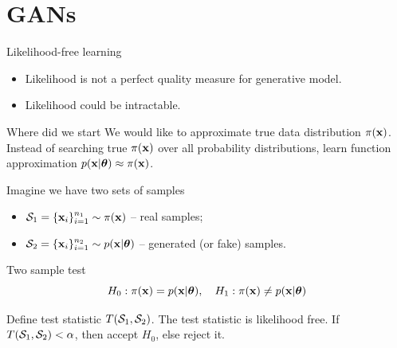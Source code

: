 \documentclass{beamer}
\begin{document}
\section{GANs}
\begin{frame}{Likelihood-free learning}
	\begin{itemize}
		\item Likelihood is not a perfect quality measure for generative model.
		\item Likelihood could be intractable.
	\end{itemize}
	\begin{block}{Where did we start}
	 We would like to approximate true data distribution $\pi(\mathbf{x})$.
		Instead of searching true $\pi(\mathbf{x})$ over all probability distributions, learn function approximation $p(\mathbf{x} | \boldsymbol{\theta}) \approx \pi(\mathbf{x})$.
	\end{block}
	Imagine we have two sets of samples 
	\begin{itemize}
		\item $\mathcal{S}_1 = \{\mathbf{x}_i\}_{i=1}^{n_1} \sim \pi(\mathbf{x})$ -- real samples;
		\item $\mathcal{S}_2 = \{\mathbf{x}_i\}_{i=1}^{n_2} \sim p(\mathbf{x} | \boldsymbol{\theta})$ -- generated (or fake) samples.
	\end{itemize}
	\begin{block}{Two sample test}
		\vspace{-0.3cm}
		\[
			H_0: \pi(\mathbf{x}) = p(\mathbf{x} | \boldsymbol{\theta}), \quad H_1: \pi(\mathbf{x}) \neq p(\mathbf{x} | \boldsymbol{\theta})
		\]
	\end{block}
	Define test statistic $T(\mathcal{S}_1, \mathcal{S}_2)$. The test statistic is likelihood free.
	If $T(\mathcal{S}_1, \mathcal{S}_2) < \alpha$, then accept $H_0$, else reject it.
\end{frame}
\end{document}
